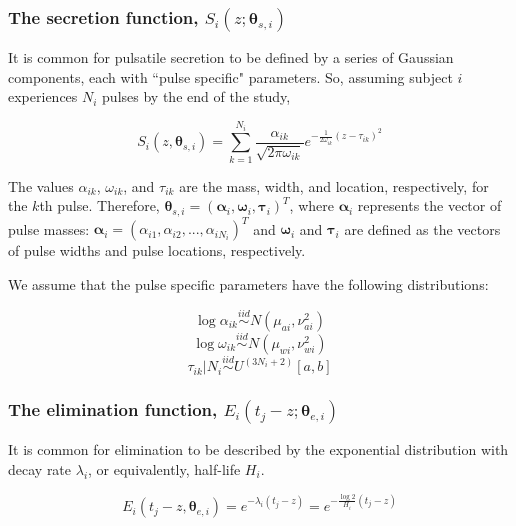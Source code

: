 \documentclass[11pt]{book}
\begin{document}
\subsubsection{The secretion function, $S_i(z;\boldsymbol{\theta}_{s,i})$} It is common for pulsatile secretion to be defined by a series of Gaussian components, each with ``pulse specific" parameters. So, assuming subject $i$ experiences $N_i$ pulses by the end of the study,


\begin{equation}
S_i(z,\boldsymbol{\theta}_{s,i}) = \sum_{k=1}^{N_i}  \frac{\alpha_{ik}}{\sqrt{2\pi\omega_{ik}}}e^{-\frac{1}{2\omega_{ik}}(z-\tau_{ik})^2}
\label{eq:Secretion}
\end{equation}


The values $\alpha_{ik}$, $\omega_{ik}$, and $\tau_{ik}$ are the mass, width, and location, respectively, for the $k$th pulse. Therefore, $\boldsymbol{\theta}_{s,i} = (\boldsymbol{\alpha}_i,\boldsymbol{\omega}_i,\boldsymbol{\tau}_i)^T$, where $\boldsymbol{\alpha}_i$ represents the vector of pulse masses: $\boldsymbol{\alpha}_i = (\alpha_{i1},\alpha_{i2},...,\alpha_{iN_i})^T$ and $\boldsymbol{\omega}_i$ and $\boldsymbol{\tau}_i$ are defined as the vectors of pulse widths and pulse locations, respectively.


We assume that the pulse specific parameters have the following distributions:


$$
\log \alpha_{ik} \stackrel{iid}{\sim} N(\mu_{ai},\nu^2_{ai})
$$
$$
\log \omega_{ik} \stackrel{iid}{\sim} N(\mu_{wi}, \nu^2_{wi})
$$
$$
\tau_{ik}|N_i \stackrel{iid}{\sim} U^{(3N_i + 2)}[a,b]
$$


\subsubsection{The elimination function, $E_i(t_j-z;\boldsymbol{\theta}_{e,i})$} It is common for elimination to be described by the exponential distribution with decay rate $\lambda_i$, or equivalently, half-life $H_i$.


\begin{equation}
E_i(t_j-z,\boldsymbol{\theta}_{e,i}) =e^{-\lambda_i(t_j-z)} = e^{-\frac{\log 2}{H_i}(t_j-z)}
\label{eq:Elimination}
\end{equation}
\end{document}
